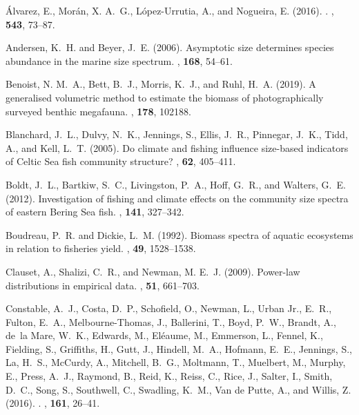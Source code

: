 \begin{thebibliography}{}

\'Alvarez, E., Mor\'an, X. A.~G., L\'opez-Urrutia, A., and Nogueira, E. (2016).
.
, {\bf 543}, 73--87.

Andersen, K.~H. and Beyer, J.~E. (2006).
\newblock Asymptotic size determines species abundance in the marine size
  spectrum.
, {\bf 168}, 54--61.

Benoist, N. M.~A., Bett, B.~J., Morris, K.~J., and Ruhl, H.~A. (2019).
\newblock A generalised volumetric method to estimate the biomass of
  photographically surveyed benthic megafauna.
, {\bf 178}, 102188.

Blanchard, J.~L., Dulvy, N.~K., Jennings, S., Ellis, J.~R., Pinnegar, J.~K.,
  Tidd, A., and Kell, L.~T. (2005).
\newblock Do climate and fishing influence size-based indicators of {C}eltic
  {S}ea fish community structure?
, {\bf 62}, 405--411.

Boldt, J.~L., Bartkiw, S.~C., Livingston, P.~A., Hoff, G.~R., and Walters,
  G.~E. (2012).
\newblock Investigation of fishing and climate effects on the community size
  spectra of eastern {B}ering {S}ea fish.
, {\bf 141}, 327--342.

Boudreau, P.~R. and Dickie, L.~M. (1992).
\newblock Biomass spectra of aquatic ecosystems in relation to fisheries yield.
, {\bf 49}, 1528--1538.

Clauset, A., Shalizi, C.~R., and Newman, M. E.~J. (2009).
\newblock Power-law distributions in empirical data.
, {\bf 51}, 661--703.

Constable, A.~J., Costa, D.~P., Schofield, O., Newman, L., {Urban Jr.}, E.~R.,
  Fulton, E.~A., Melbourne-Thomas, J., Ballerini, T., Boyd, P.~W., Brandt, A.,
  de~la Mare, W.~K., Edwards, M., El\'eaume, M., Emmerson, L., Fennel, K.,
  Fielding, S., Griffiths, H., Gutt, J., Hindell, M.~A., Hofmann, E.~E.,
  Jennings, S., La, H.~S., Mc{C}urdy, A., Mitchell, B.~G., Moltmann, T.,
  Muelbert, M., Murphy, E., Press, A.~J., Raymond, B., Reid, K., Reiss, C.,
  Rice, J., Salter, I., Smith, D.~C., Song, S., Southwell, C., Swadling, K.~M.,
  {Van de Putte}, A., and Willis, Z. (2016).
.
, {\bf 161}, 26--41.


\end{thebibliography}
